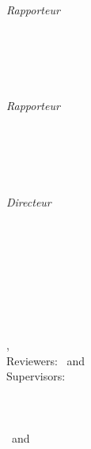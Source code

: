 \begin{titlepage}
    \vfill
    \begin{minipage}[t]{.27\textwidth}
        \raggedleft
        \textit{Rapporteur}
    \end{minipage}
    \hspace*{15pt}
    \begin{minipage}[t]{.65\textwidth}
        {\Large \thesisFirstReviewer} \\
        {\small \thesisFirstReviewerDepartment} \\[-1mm]
        {\small \thesisFirstReviewerUniversity}
    \end{minipage} \\[5mm]
    \begin{minipage}[t]{.27\textwidth}
        \raggedleft
        \textit{Rapporteur}
    \end{minipage}
    \hspace*{15pt}
    \begin{minipage}[t]{.65\textwidth}
        {\Large \thesisSecondReviewer} \\
        {\small \thesisSecondReviewerDepartment} \\[-1mm]
        {\small \thesisSecondReviewerUniversity}
    \end{minipage} \\[10mm]
    \begin{minipage}[t]{.27\textwidth}
        \raggedleft
        \textit{Directeur}
    \end{minipage}
    \hspace*{15pt}
    \begin{minipage}[t]{.65\textwidth}
        {\Large \thesisFirstSupervisor}\\
        {\small \thesisUniversity} \\[-1mm]
        {\small \thesisUniversityDepartment}
    \end{minipage} \\[15mm]

    \thesisDateFr \\

\end{titlepage}


\hfill
\vfill
{\small
\textbf{\thesisName} \\
\textit{\thesisTitle} \\
\thesisSubject, \thesisDate \\
Reviewers: \thesisFirstReviewer\ and \thesisSecondReviewer \\
Supervisors: \thesisFirstSupervisor\\[1.5em]
\textbf{\thesisUniversity} \\
\thesisUniversityDepartment \\
\thesisUniversityStreetAddress \\
\thesisUniversityPostalCode\ and \thesisUniversityCity
}
